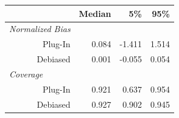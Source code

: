 \begin{tabular}{r|rrr}
\toprule
  & Median & 5\% & 95\%\\
\midrule
\multicolumn{1}{l|}{\textit{Normalized Bias}}\\
Plug-In & 0.084 & -1.411 & 1.514\\
Debiased & 0.001 & -0.055 & 0.054\\
\midrule
\multicolumn{1}{l|}{\textit{Coverage}}\\
Plug-In & 0.921 & 0.637 & 0.954\\
Debiased & 0.927 & 0.902 & 0.945\\
\bottomrule
\end{tabular}

